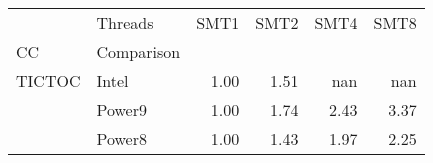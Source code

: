 \begin{tabular}{llrrrr}
\toprule
       & Threads &  SMT1 &  SMT2 &  SMT4 &  SMT8 \\
CC & Comparison &       &       &       &       \\
\midrule
TICTOC & Intel &  1.00 &  1.51 &   nan &   nan \\
       & Power9 &  1.00 &  1.74 &  2.43 &  3.37 \\
       & Power8 &  1.00 &  1.43 &  1.97 &  2.25 \\
\bottomrule
\end{tabular}
